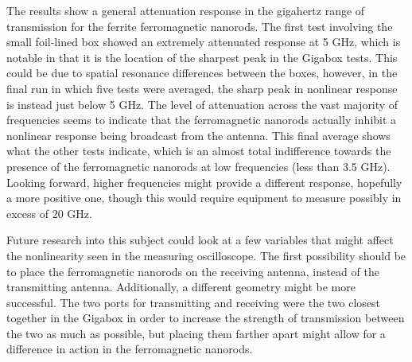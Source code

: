 The results show a general attenuation response in the gigahertz range of transmission for the ferrite ferromagnetic nanorods. The first test involving the small foil-lined box showed an extremely attenuated response at 5 GHz, which is notable in that it is the location of the sharpest peak in the Gigabox tests. This could be due to spatial resonance differences between the boxes, however, in the final run in which five tests were averaged, the sharp peak in nonlinear response is instead just below 5 GHz. The level of attenuation across the vast majority of frequencies seems to indicate that the ferromagnetic nanorods actually inhibit a nonlinear response being broadcast from the antenna. This final average shows what the other tests indicate, which is an almost total indifference towards the presence of the ferromagnetic nanorods at low frequencies (less than 3.5 GHz). Looking forward, higher frequencies might provide a different response, hopefully a more positive one, though this would require equipment to measure possibly in excess of 20 GHz.

Future research into this subject could look at a few variables that might affect the nonlinearity seen in the measuring oscilloscope. The first possibility should be to place the ferromagnetic nanorods on the receiving antenna, instead of the transmitting antenna. Additionally, a different geometry might be more successful. The two ports for transmitting and receiving were the two closest together in the Gigabox in order to increase the strength of transmission between the two as much as possible, but placing them farther apart might allow for a difference in action in the ferromagnetic nanorods.


